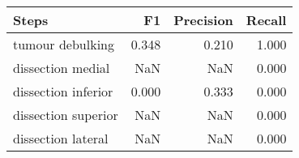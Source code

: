 \begin{tabular}{lrrr}
\toprule
Steps & F1 & Precision & Recall \\
\midrule
tumour debulking & 0.348 & 0.210 & 1.000 \\
dissection medial & NaN & NaN & 0.000 \\
dissection inferior & 0.000 & 0.333 & 0.000 \\
dissection superior & NaN & NaN & 0.000 \\
dissection lateral & NaN & NaN & 0.000 \\
\bottomrule
\end{tabular}
